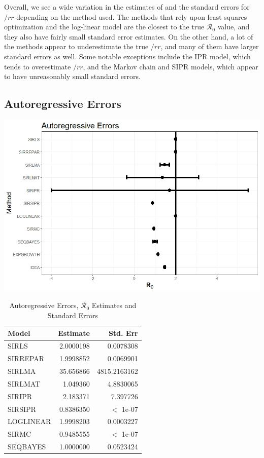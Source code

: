 \message{ !name(draft_v13.tex)}\documentclass[12pt]{article}
\newcommand{\rr}{\ensuremath{\mathcal{R}_0}}
\begin{document}
Overall, we see a wide variation in the estimates of and the standard errors for $/rr$ depending on the method used. The methods that rely upon least squares optimization and the log-linear model are the closest to the true $\rr$ value, and they also have fairly small standard error estimates. On the other hand, a lot of the methods appear to underestimate the true $/rr$, and many of them have larger standard errors as well. Some notable exceptions include the IPR model, which tends to overestimate $/rr$, and the Markov chain and SIPR models, which appear to have unreasonably small standard errors.

\subsection{Autoregressive Errors}\label{sec:res-AR}

\includegraphics[scale=0.5]{images/AR.jpeg}
\begin{table}[H]
	
	\caption{\label{tab:}Autoregressive Errors, $\rr$ Estimates and Standard Errors}
	\centering
	\begin{tabular}[t]{l|r|r}
		\hline
		Model & Estimate & Std. Err\\
		\hline
		SIRLS & 2.0000198 & 0.0078308\\
		\hline
		SIRREPAR & 1.9998852 & 0.0069901 \\
		\hline
		SIRLMA & 35.656866 & 4815.2163162\\
		\hline
		SIRLMAT & 1.049360 & 4.8830065 \\
		\hline
		SIRIPR & 2.183371 & 7.397726 \\
		\hline
		SIRSIPR & 0.8386350 & $<$ 1e-07 \\
		\hline
		LOGLINEAR & 1.9998203 & 0.0003227\\
		\hline
		SIRMC & 0.9485555 & $<$ 1e-07 \\
		\hline
		SEQBAYES & 1.0000000 & 0.0523424\\
		\hline
	\end{tabular}
\end{table}
\end{document}
